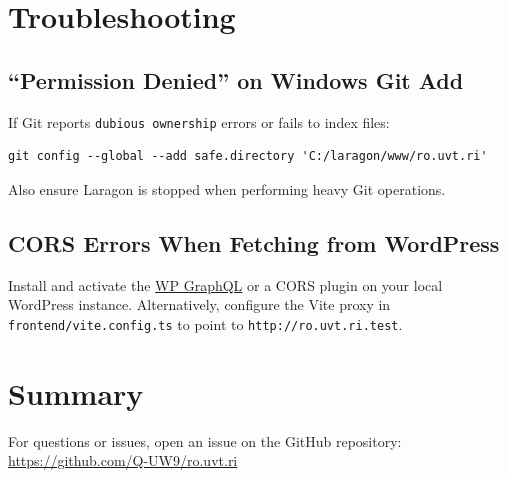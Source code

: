 \documentclass[11pt,a4paper]{article}
\begin{document}
\section{Troubleshooting}

\subsection{``Permission Denied'' on Windows Git Add}

If Git reports \texttt{dubious ownership} errors or fails to index files:
\begin{lstlisting}
git config --global --add safe.directory 'C:/laragon/www/ro.uvt.ri'
\end{lstlisting}
Also ensure Laragon is stopped when performing heavy Git operations.

\subsection{CORS Errors When Fetching from WordPress}

Install and activate the
\href{https://wordpress.org/plugins/wp-graphql/}{WP GraphQL} or a CORS
plugin on your local WordPress instance. Alternatively, configure the
Vite proxy in \texttt{frontend/vite.config.ts} to point to \texttt{http://ro.uvt.ri.test}.

\section{Summary}

\begin{center}
\end{center}

\vspace{1em}

For questions or issues, open an issue on the GitHub repository: \\
\url{https://github.com/Q-UW9/ro.uvt.ri}
\end{document}
